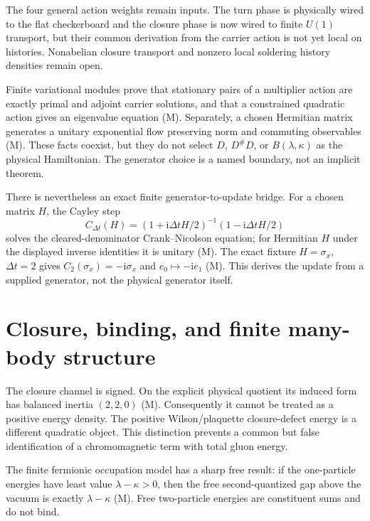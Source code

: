 \documentclass[11pt]{article}
\newcommand{\Mtag}{\textcolor{verified}{\textsc{M}}}
\newcommand{\ii}{\mathrm{i}}
\begin{document}
The four general action weights remain inputs.  The turn phase is physically
wired to the flat checkerboard and the closure phase is now wired to finite
$U(1)$ transport, but their common derivation from the carrier action is not
yet local on histories.  Nonabelian closure transport and nonzero local
soldering history densities remain open.

Finite variational modules prove that stationary pairs of a multiplier action
are exactly primal and adjoint carrier solutions, and that a constrained quadratic
action gives an eigenvalue equation (\Mtag).  Separately, a chosen Hermitian
matrix generates a unitary exponential flow preserving norm and commuting
observables (\Mtag).  These facts coexist, but they do not select $D$, $D^\#D$,
or $B(\lambda,\kappa)$ as the physical Hamiltonian.  The generator choice is a
named boundary, not an implicit theorem.

There is nevertheless an exact finite generator-to-update bridge.  For a
chosen matrix $H$, the Cayley step
\begin{equation}\label{eq:cayley}
 C_{\Delta t}(H)=
 (1+\ii\Delta t H/2)^{-1}(1-\ii\Delta t H/2)
\end{equation}
solves the cleared-denominator Crank--Nicolson equation; for Hermitian $H$
under the displayed inverse identities it is unitary (\Mtag).  The exact
fixture $H=\sigma_x$, $\Delta t=2$ gives
$C_2(\sigma_x)=-\ii\sigma_x$ and $e_0\mapsto-\ii e_1$ (\Mtag).  This derives
the update from a supplied generator, not the physical generator itself.

\section{Closure, binding, and finite many-body structure}

The closure channel is signed.  On the explicit physical quotient its induced
form has balanced inertia $(2,2,0)$ (\Mtag).  Consequently it cannot be treated
as a positive energy density.  The positive Wilson/plaquette closure-defect
energy is a different quadratic object.  This distinction prevents a common
but false identification of a chromomagnetic term with total gluon energy.

The finite fermionic occupation model has a sharp free result: if the
one-particle energies have least value $\lambda-\kappa>0$, then the free
second-quantized gap above the vacuum is exactly $\lambda-\kappa$ (\Mtag).
Free two-particle energies are constituent sums and do not bind.
\end{document}
